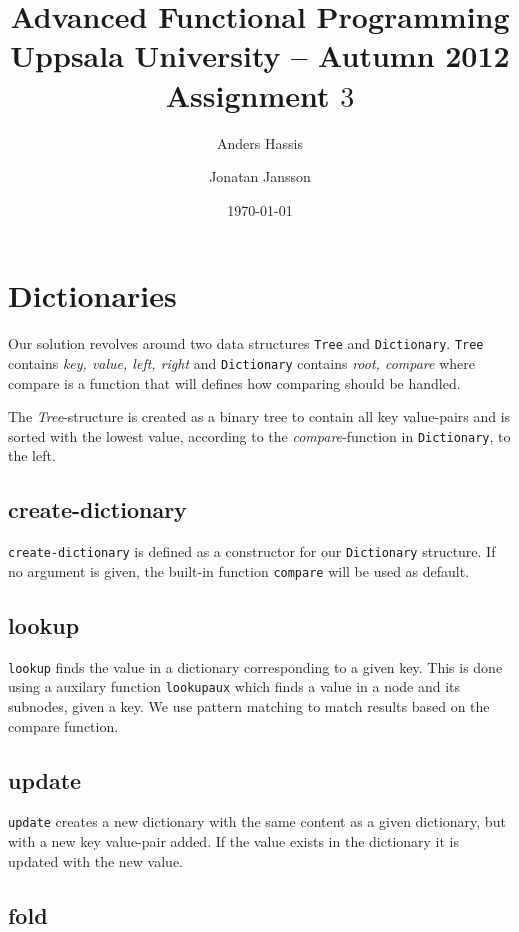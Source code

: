 \documentclass[a4paper,11pt]{article}
\title{\textbf{Advanced Functional Programming \\
    Uppsala University -- Autumn 2012 \\
    Assignment $3$ %
  }
}
\author{Anders Hassis \and Jonatan Jansson}
\date{\today}
\begin{document}
\maketitle

\section{Dictionaries}

Our solution revolves around two data structures \texttt{Tree} and \texttt{Dictionary}. \texttt{Tree} contains \emph{key, value, left, right} and \texttt{Dictionary} contains \emph{root, compare} where compare is a function that will defines how comparing should be handled.

The \emph{Tree}-structure is created as a binary tree to contain all key value-pairs and is sorted with the lowest value, according to the \emph{compare}-function in \texttt{Dictionary}, to the left.

\subsection{create-dictionary}

\texttt{create-dictionary} is defined as a constructor for our \texttt{Dictionary} structure. If no argument is given, the built-in function \texttt{compare} will be used as default.

\subsection{lookup}

\texttt{lookup} finds the value in a dictionary corresponding to a given key. This is done using a auxilary function \texttt{lookupaux} which finds a value in a node and its subnodes, given a key. We use pattern matching to match results based on the compare function.

\subsection{update}

\texttt{update} creates a new dictionary with the same content as a given dictionary, but with a new key value-pair added. If the value exists in the dictionary it is updated with the new value.

\subsection{fold}
\end{document}
